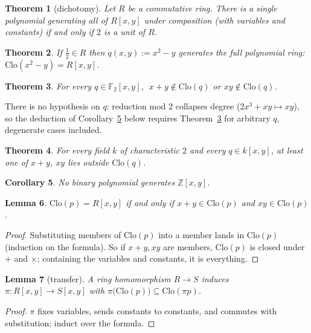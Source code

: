 \documentclass[11pt]{article}
\newtheorem{theorem}{Theorem}
\newtheorem{lemma}[theorem]{Lemma}
\newtheorem{corollary}[theorem]{Corollary}
\theoremstyle{definition}
\newcommand{\F}{\mathbb{F}}
\newcommand{\Z}{\mathbb{Z}}
\newcommand{\Clo}{\mathrm{Clo}}
\begin{document}
\begin{theorem}[dichotomy]\label{thm:dichotomy}
Let $R$ be a commutative ring.  There is a single polynomial
generating all of $R[x,y]$ under composition (with variables and
constants) if and only if $2$ is a unit of $R$.
\end{theorem}

\begin{theorem}\label{thm:converse}
If $\tfrac12 \in R$ then $q(x,y) := x^2 - y$ generates the full
polynomial ring: $\Clo(x^2 - y) = R[x,y]$.
\end{theorem}

\begin{theorem}\label{thm:F2}
For every $q \in \F_2[x,y]$, $\;x + y \notin \Clo(q)$ or
$xy \notin \Clo(q)$.
\end{theorem}

There is no hypothesis on $q$: reduction mod $2$ collapses degree
($2x^3 + xy \mapsto xy$), so the deduction of
Corollary~\ref{cor:Z} below requires Theorem~\ref{thm:F2} for
arbitrary $q$, degenerate cases included.

\begin{theorem}\label{thm:char2}
For every field $k$ of characteristic $2$ and every $q \in k[x,y]$,
at least one of $x+y$, $xy$ lies outside $\Clo(q)$.
\end{theorem}

\begin{corollary}\label{cor:Z}
No binary polynomial generates $\Z[x,y]$.
\end{corollary}

\begin{lemma}\label{lem:criterion}
$\Clo(p) = R[x,y]$ if and only if $x + y \in \Clo(p)$ and
$xy \in \Clo(p)$.
\end{lemma}

\begin{proof}
Substituting members of $\Clo(p)$ into a member lands in $\Clo(p)$
(induction on the formula).  So if $x+y, xy$ are members, $\Clo(p)$
is closed under $+$ and $\times$; containing the variables and
constants, it is everything.
\end{proof}

\begin{lemma}[transfer]\label{lem:transfer}
A ring homomorphism $R \to S$ induces
$\pi : R[x,y] \to S[x,y]$ with
$\pi\bigl(\Clo(p)\bigr) \subseteq \Clo(\pi p)$.
\end{lemma}

\begin{proof}
$\pi$ fixes variables, sends constants to constants, and commutes
with substitution; induct over the formula.
\end{proof}
\end{document}
